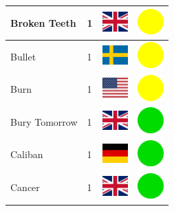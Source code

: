 \documentclass[12pt, a4paper, twoside]{report}
\begin{document}
\begin{center}
\begin{longtable}{|p{5cm}|p{2cm}|p{2cm}|p{2cm}|}
			Broken Teeth & 1 & \includegraphics[width=1cm]{4x3/gb} & \includegraphics[width=1cm]{likes/m} \\ \hline
			Bullet & 1 & \includegraphics[width=1cm]{4x3/se} & \includegraphics[width=1cm]{likes/m} \\ \hline
			Burn & 1 & \includegraphics[width=1cm]{4x3/us} & \includegraphics[width=1cm]{likes/m} \\ \hline
			Bury Tomorrow & 1 & \includegraphics[width=1cm]{4x3/gb} & \includegraphics[width=1cm]{likes/y} \\ \hline
			Caliban & 1 & \includegraphics[width=1cm]{4x3/de} & \includegraphics[width=1cm]{likes/y} \\ \hline
			Cancer & 1 & \includegraphics[width=1cm]{4x3/gb} & \includegraphics[width=1cm]{likes/y} \\ \hline

\end{longtable}
\end{center}
\end{document}
